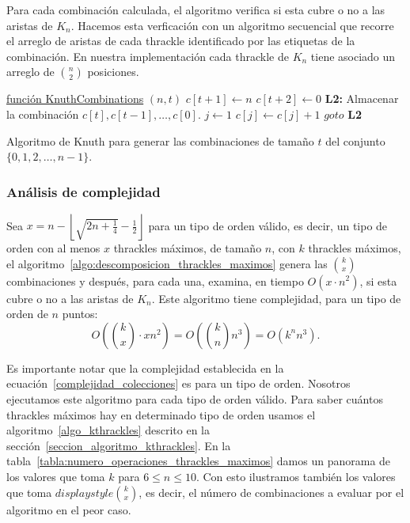   Para cada combinación calculada, el algoritmo verifica si esta cubre o no a las aristas
  de $K_n$. Hacemos esta verficación con un algoritmo secuencial que recorre el arreglo
  de aristas de cada thrackle identificado por las etiquetas de la combinación. En
  nuestra implementación cada thrackle de $K_n$ tiene asociado un arreglo de
  $\binom{n}{2}$ posiciones.
  \begin{algorithm}[p]
    \DontPrintSemicolon
    \underline{función KnuthCombinations} $(n,t)$\;
    $c[t+1] \gets n$\;
    $c[t+2] \gets 0$\;
    \textbf{L2: } \;
    Almacenar la combinación $c[t],c[t-1],\dots,c[0]$. \;
    $j \gets 1$ \;
    $c[j] \gets c[j]+1$ \;
    $goto$\textbf{ L2}\;
    \caption{Algoritmo de Knuth para generar las combinaciones de tamaño $t$ del conjunto $\{0,1,2,\dots,n-1\}$.}
    \label{algo:knuth_combinaciones}
  \end{algorithm}


  \subsubsection{Análisis de complejidad}
  Sea $x=n - \left\lfloor\sqrt{2n + \frac{1}{4}} - \frac{1}{2}\right\rfloor$ para un tipo de orden válido, es decir, un tipo de orden con al menos $x$ thrackles máximos, de tamaño $n$, con $k$ thrackles máximos, el algoritmo~\ref{algo:descomposicion_thrackles_maximos} genera las
  $\binom{k}{x}$ combinaciones y después, para cada una, examina, en tiempo $O(x \cdot n^2)$, si esta cubre o no a las aristas de $K_n$. Este algoritmo tiene complejidad, para un tipo de orden de $n$ puntos:
  \begin{equation}\displaystyle
    O\left(\binom{k}{x}\cdot x n^2 \right) = O \left( \binom{k}{n} n^3 \right) = O(k^n n^3).
    \label{complejidad_colecciones}
  \end{equation}

  Es importante notar que la complejidad establecida en la
  ecuación~\ref{complejidad_colecciones} es para un tipo de orden. Nosotros
  ejecutamos este algoritmo para cada tipo de orden válido. Para saber cuántos thrackles
  máximos hay en determinado tipo de orden usamos el algoritmo~\ref{algo_kthrackles} descrito en la
  sección~\ref{seccion_algoritmo_kthrackles}. En la
  tabla~\ref{tabla:numero_operaciones_thrackles_maximos} damos un panorama de los valores que toma
  $k$ para $6\leq n \leq 10$. Con esto ilustramos también los valores que toma
  $displaystyle \binom{k}{x}$, es decir, el número de  combinaciones a evaluar por el algoritmo en el
  peor caso.

